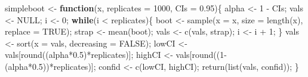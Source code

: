 \documentclass[
]{scrbook}
\newenvironment{Shaded}{\begin{snugshade}}{\end{snugshade}}
\newcommand{\AttributeTok}[1]{\textcolor[rgb]{0.77,0.63,0.00}{#1}}
\newcommand{\ConstantTok}[1]{\textcolor[rgb]{0.00,0.00,0.00}{#1}}
\newcommand{\ControlFlowTok}[1]{\textcolor[rgb]{0.13,0.29,0.53}{\textbf{#1}}}
\newcommand{\DecValTok}[1]{\textcolor[rgb]{0.00,0.00,0.81}{#1}}
\newcommand{\FloatTok}[1]{\textcolor[rgb]{0.00,0.00,0.81}{#1}}
\newcommand{\FunctionTok}[1]{\textcolor[rgb]{0.00,0.00,0.00}{#1}}
\newcommand{\NormalTok}[1]{#1}
\newcommand{\OtherTok}[1]{\textcolor[rgb]{0.56,0.35,0.01}{#1}}
\newcommand{\SpecialCharTok}[1]{\textcolor[rgb]{0.00,0.00,0.00}{#1}}
\begin{document}
\begin{Shaded}
\begin{Highlighting}[]
\NormalTok{simpleboot }\OtherTok{\textless{}{-}} \ControlFlowTok{function}\NormalTok{(x, }\AttributeTok{replicates =} \DecValTok{1000}\NormalTok{, }\AttributeTok{CIs =} \FloatTok{0.95}\NormalTok{)\{}
\NormalTok{  alpha }\OtherTok{\textless{}{-}} \DecValTok{1} \SpecialCharTok{{-}}\NormalTok{ CIs;}
\NormalTok{    vals  }\OtherTok{\textless{}{-}} \ConstantTok{NULL}\NormalTok{;                                                           }
\NormalTok{    i     }\OtherTok{\textless{}{-}} \DecValTok{0}\NormalTok{;                                                            }
    \ControlFlowTok{while}\NormalTok{(i }\SpecialCharTok{\textless{}}\NormalTok{ replicates)\{                                                          }
\NormalTok{        boot  }\OtherTok{\textless{}{-}} \FunctionTok{sample}\NormalTok{(}\AttributeTok{x =}\NormalTok{ x, }\AttributeTok{size =} \FunctionTok{length}\NormalTok{(x), }\AttributeTok{replace =} \ConstantTok{TRUE}\NormalTok{);               }
\NormalTok{        strap }\OtherTok{\textless{}{-}} \FunctionTok{mean}\NormalTok{(boot);                                                  }
\NormalTok{        vals  }\OtherTok{\textless{}{-}} \FunctionTok{c}\NormalTok{(vals, strap);                                             }
\NormalTok{        i     }\OtherTok{\textless{}{-}}\NormalTok{ i }\SpecialCharTok{+} \DecValTok{1}\NormalTok{;                                                       }
\NormalTok{    \}                                                                      }
\NormalTok{    vals   }\OtherTok{\textless{}{-}} \FunctionTok{sort}\NormalTok{(}\AttributeTok{x =}\NormalTok{ vals, }\AttributeTok{decreasing =} \ConstantTok{FALSE}\NormalTok{);                                 }
\NormalTok{    lowCI  }\OtherTok{\textless{}{-}}\NormalTok{ vals[}\FunctionTok{round}\NormalTok{((alpha}\SpecialCharTok{*}\FloatTok{0.5}\NormalTok{)}\SpecialCharTok{*}\NormalTok{replicates)];                              }
\NormalTok{    highCI }\OtherTok{\textless{}{-}}\NormalTok{ vals[}\FunctionTok{round}\NormalTok{((}\DecValTok{1}\SpecialCharTok{{-}}\NormalTok{(alpha}\SpecialCharTok{*}\FloatTok{0.5}\NormalTok{))}\SpecialCharTok{*}\NormalTok{replicates)];                          }
\NormalTok{    confid }\OtherTok{\textless{}{-}} \FunctionTok{c}\NormalTok{(lowCI, highCI);                                               }
    \FunctionTok{return}\NormalTok{(}\FunctionTok{list}\NormalTok{(vals, confid));                                                             }
\NormalTok{\} }
\end{Highlighting}
\end{Shaded}
\end{document}
